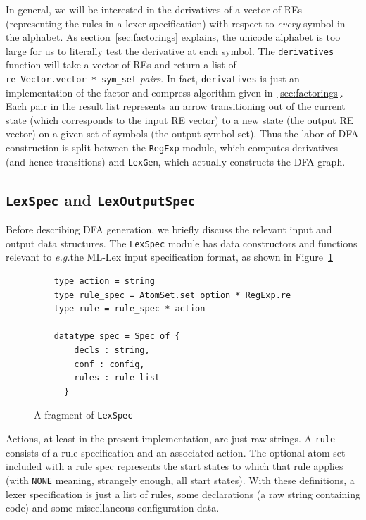 \documentclass[11pt]{article}
\newcommand{\eg}{{\em e.g.}}
\newcommand{\nm}[1]{\texttt{#1}}
\begin{document}
In general, we will be interested in the derivatives of a vector of REs
(representing the rules in a lexer specification) with respect to \emph{every}
symbol in the alphabet.  As section~\ref{sec:factorings} explains, the unicode
alphabet is too large for us to literally test the derivative at each symbol. 
The \nm{derivatives} function will take a vector of REs and return a list of
\nm{re~Vector.vector~*~sym\_set} \emph{pairs}.  In fact, \nm{derivatives}
is just an implementation of the factor and compress algorithm given
in~\ref{sec:factorings}.  Each pair in the result list represents an arrow
transitioning out of the current state (which corresponds to the input RE
vector) to a new state (the output RE vector) on a given set of symbols (the
output symbol set).  Thus the labor of DFA construction is split between the
\nm{RegExp} module, which computes derivatives (and hence transitions) and
\nm{LexGen}, which actually constructs the DFA graph.

\subsection{\nm{LexSpec} and \nm{LexOutputSpec}}

Before describing DFA generation, we briefly discuss the relevant input and
output data structures.  The \nm{LexSpec} module has data constructors and
functions relevant to \eg the ML-Lex input specification format, as shown in
Figure~\ref{fig:lex-spec}

\begin{figure}
\begin{verbatim}
    type action = string
    type rule_spec = AtomSet.set option * RegExp.re
    type rule = rule_spec * action

    datatype spec = Spec of {
        decls : string,
        conf : config,
        rules : rule list
      }
\end{verbatim}
\caption{A fragment of \nm{LexSpec}}\label{fig:lex-spec}
\end{figure}

Actions, at least in the present implementation, are just raw strings.  A
\nm{rule} consists of a rule specification and an associated action.  The
optional atom set included with a rule spec represents the start states
to which that rule applies (with \nm{NONE} meaning, strangely enough, all start
states).  With these definitions, a lexer specification is just a list of
rules, some declarations (a raw string containing code) and some miscellaneous
configuration data.
\end{document}

